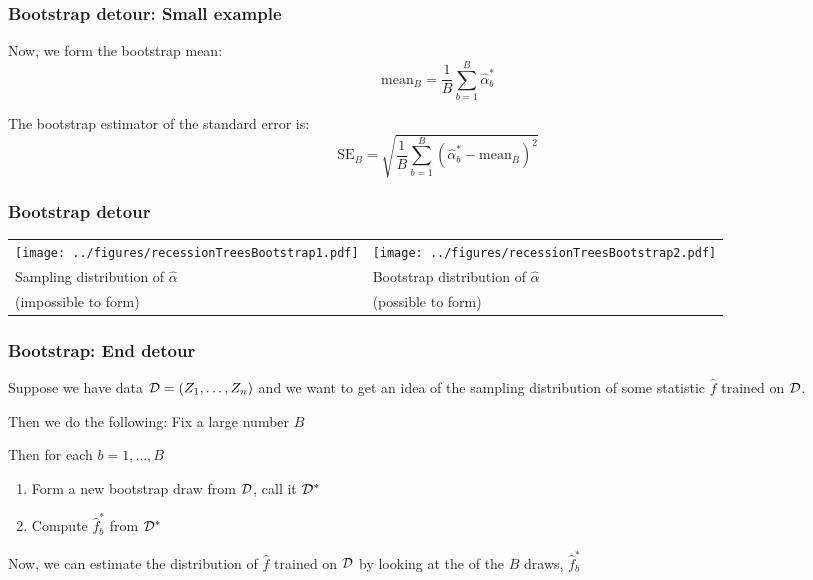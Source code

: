 \documentclass[12pt]{beamer}
\begin{document}
\begin{frame}[fragile]
\frametitle{Bootstrap detour: Small example}
Now, we form the bootstrap mean:
\[
\textrm{mean}_B = \frac{1}{B} \sum_{b=1}^B \hat\alpha_b^{*} 
\]
\vsp

The bootstrap estimator of the standard error is:
\[
\textrm{SE}_B = \sqrt{\frac{1}{B} \sum_{b=1}^B \left(\hat\alpha_b^{*} - \textrm{mean}_B\right)^2}
\]

\end{frame}

\begin{frame}[fragile]
\frametitle{Bootstrap detour}

\begin{table}
\begin{tabular}{p{2in}p{2.5in}}
\texttt{[image: ../figures/recessionTreesBootstrap1.pdf]} &
\texttt{[image: ../figures/recessionTreesBootstrap2.pdf]} \\
Sampling distribution of $\hat\alpha$   & Bootstrap distribution of $\hat\alpha$ \\
(impossible to form)  & (possible to form)  \\
\end{tabular}
\end{table}
\end{frame}

\begin{frame}
\frametitle{Bootstrap: End detour}
\vsp

Suppose we have data $\mathcal{D} = (Z_1, \ldots, Z_n)$ and we want to get an idea of the sampling
distribution of some statistic $\hat{f}$ trained on $\mathcal{D}$.  

\vsp
Then we do the following: Fix a large number $B$


\vsp 
Then for each $b = 1,\ldots,B$
\begin{enumerate}
\item Form a new bootstrap draw from $\mathcal{D}$, call it $\mathcal{D}^*$
\item Compute $\hat f_b^*$ from $\mathcal{D}^*$ 
\end{enumerate}
Now, we can estimate the distribution of $\hat f$ trained on $\mathcal{D}$ by looking at the 
 of the $B$ draws, $\hat f_b^*$
\end{frame}
\end{document}
